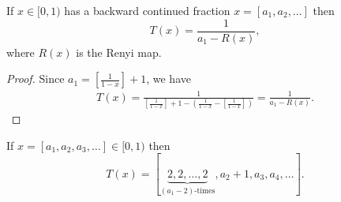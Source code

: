 \documentclass[letterpaper,10pt,reqno]{amsart}
\numberwithin{equation}{section}     %
\begin{document}
  
 \begin{lemma}\label{TyR}
 If $x \in [0,1)$ has a backward continued fraction $x=[a_1, a_2, \dots]$ then 
\begin{equation}
T(x)=  \frac{1}{a_1 - R(x)},
\end{equation}
where $R(x)$ is the Renyi map. 
 \end{lemma}
 
 \begin{proof}
 Since $a_1= \left[\frac{1}{1-x}\right]+1$, we have
  \begin{eqnarray*}
 T(x)=\frac{1}{\left[\frac{1}{1-x}	\right] + 1 -\left( \frac{1}{1-x} -\left[\frac{1}{1-x}	\right] \right)}=  \frac{1}{a_1 - R(x)}.
  \end{eqnarray*}
 \end{proof}



 \begin{theorem} \label{action}
 If $x=[a_1, a_2, a_3, \dots] \in [0,1)$ then
 \begin{equation*}
 T(x)=[\underbrace{2,2,\dots,2}_{(a_1-2)\textrm{-times}}, a_2+ 1, a_3, a_4, \dots].
 \end{equation*}
 \end{theorem}
 
\end{document}
